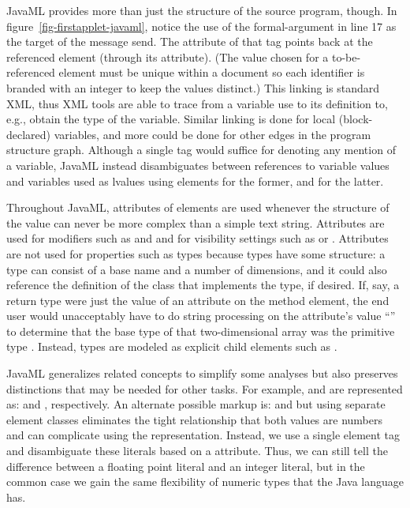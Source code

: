 \documentclass{article}
\begin{document}
\begin{multicols}{2}
JavaML provides more than just the structure of the source program,
though.  In figure~\ref{fig-firstapplet-javaml}, notice the use of the formal-argument
 in line 17 as the target of the message send.  The
 attribute of that  tag points back at
the referenced  element (through its
 attribute).  (The  value chosen for a
to-be-referenced element must be unique within a document so each
identifier is branded with an integer to keep the values distinct.)
This linking is standard XML, thus XML tools are able to trace from a
variable use to its definition to, e.g., obtain the type of the
variable.  Similar linking is done for local (block-declared) variables, 
and more could be done for other edges in the program structure graph.
Although a single  tag would suffice for denoting any
mention of a variable, JavaML instead disambiguates between references to
variable values and variables used as lvalues using 
elements for the former, and  for the latter.

Throughout JavaML, attributes of elements are used whenever the
structure of the value can never be more complex than a simple text
string.  Attributes are used for modifiers such as
 and  and for visibility settings
such as  or .  Attributes are not
used for properties such as types because types have some structure: a
type can consist of a base name and a number of dimensions, and it could
also reference the definition of the class that implements the type, if
desired.  If, say, a return type were just the value of an attribute on
the method element, the end user would unacceptably have to do string
processing on the attribute's value ``'' to determine
that the base type of that two-dimensional array was the primitive type
.  Instead, types are modeled as explicit child elements
such as .

JavaML generalizes related concepts to simplify some analyses but also
preserves distinctions that may be needed for other tasks.  For example,
 and  are represented as:
 and
, respectively.  An
alternate possible markup is: 
and  but using separate element
classes eliminates the tight relationship that both values are numbers
and can complicate using the representation.  Instead, we use a single
element tag and disambiguate these literals based on a 
attribute. Thus, we can still tell the difference between a floating
point literal and an integer literal, but in the common case we gain the
same flexibility of numeric types that the Java language has.


\end{multicols}
\end{document}
